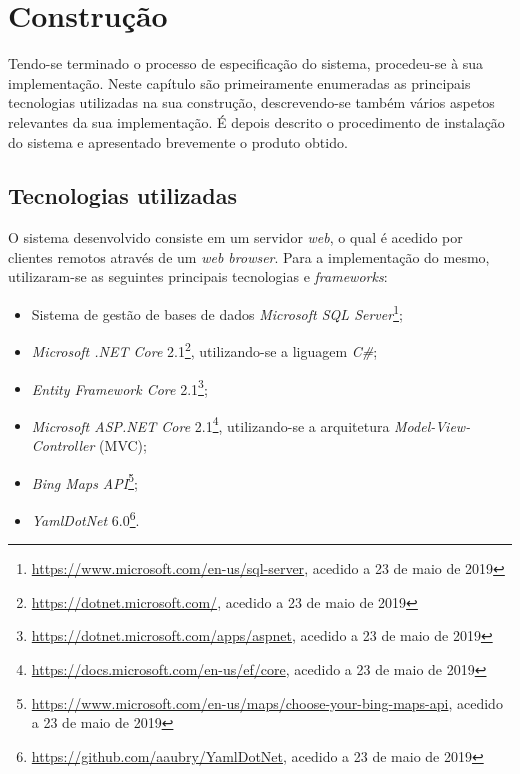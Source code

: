 
\section{Construção}
\label{cap:construcao}

Tendo-se terminado o processo de especificação do sistema, procedeu-se à sua implementação. Neste capítulo são primeiramente enumeradas as principais tecnologias utilizadas na sua construção, descrevendo-se também vários aspetos relevantes da sua implementação. É depois descrito o procedimento de instalação do sistema e apresentado brevemente o produto obtido.


\subsection{Tecnologias utilizadas}
\label{sec:construcao:tecnologias}

O sistema desenvolvido consiste em um servidor \emph{web}, o qual é acedido por clientes remotos através de um \emph{web browser}. Para a implementação do mesmo, utilizaram-se as seguintes principais tecnologias e \emph{frameworks}:

\begin{itemize}

    \item Sistema de gestão de bases de dados \emph{Microsoft SQL Server}\footnote{\url{https://www.microsoft.com/en-us/sql-server}, acedido a 23 de maio de 2019};

    \item \emph{Microsoft .NET Core} 2.1\footnote{\url{https://dotnet.microsoft.com/}, acedido a 23 de maio de 2019}, utilizando-se a liguagem \emph{C\#};

    \item \emph{Entity Framework Core} 2.1\footnote{\url{https://dotnet.microsoft.com/apps/aspnet}, acedido a 23 de maio de 2019};

    \item \emph{Microsoft ASP.NET Core} 2.1\footnote{\url{https://docs.microsoft.com/en-us/ef/core}, acedido a 23 de maio de 2019}, utilizando-se a arquitetura \emph{Model-View-Controller} (MVC);
    
    \item \emph{Bing Maps API}\footnote{\url{https://www.microsoft.com/en-us/maps/choose-your-bing-maps-api}, acedido a 23 de maio de 2019};
    
    \item \emph{YamlDotNet} 6.0\footnote{\url{https://github.com/aaubry/YamlDotNet}, acedido a 23 de maio de 2019}.

\end{itemize}

